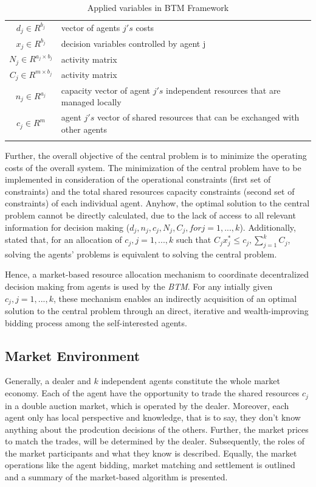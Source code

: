 \begin{longtable}{c|l}
	\hline
    $d_{j} \in R^{b_{j}}$ & vector of agents $j's$ costs \\
    $x_{j} \in R^{b_{j}}$ & decision variables controlled by agent j \\
    $N_{j} \in R^{a_{j} \times b_{j}}$ & activity matrix \\
    $C_{j} \in R^{m \times b_{j}}$ & activity matrix \\
    $n_{j} \in R^{a_{j}}$ & capacity vector of agent $j's$ independent resources that are managed locally \\
    $c_{j} \in R^{m}$ & agent $j's$ vector of shared resources that can be exchanged with other agents \\
	\hline
	\caption{Applied variables in BTM Framework}
	\label{table:sorted_gas_prices}
\end{longtable} 

Further, the overall objective of the central problem is to minimize the 
operating costs of the overall system. The minimization of the central problem
have to be implemented in consideration of the operational constraints 
(first set of constraints) and the total shared 
resources capacity constraints (second set of constraints) of each individual agent. 
Anyhow, the optimal solution to the central problem cannot be directly calculated, 
due to the lack of access to all relevant information for decision making
($d_{j}, n_{j}, c_{j}, N_{j}, C_{j}, for j=1, ..., k$). 
Additionally,  stated that, for an allocation of 
$c_{j}, j=1, ..., k$ such that $C_{j}x_{j}^{*} \leq c_{j}, \sum\limits_{j=1}^{k} C_{j}$, 
solving the agents’ problems is equivalent to solving the central problem.

Hence, a market-based resource allocation mechanism to coordinate decentralized
decision making from agents is used by the \textit{BTM}. 
For any intially given $c_{j}, j=1, ..., k$, these mechanism enables an indirectly 
acquisition of an optimal solution to the central problem through an direct, iterative and
wealth-improving bidding process among the self-interested agents. 


\subsection{Market Environment}
Generally, a dealer and $k$ independent agents constitute the whole market economy. 
Each of the agent have the opportunity to trade the shared resources $c_{j}$ 
in a double auction market, which is operated by the dealer. Moreover, each agent 
only has local perspective and knowledge, that is to say, they don't know anything about 
the prodcution decisions of the others. 
Further, the market prices to match the trades, will be determined by the dealer.
Subsequently, the roles of the market participants and what they know is described. 
Equally, the market operations like the agent bidding, market matching and settlement 
is outlined and a summary of the market-based algorithm is presented. 

